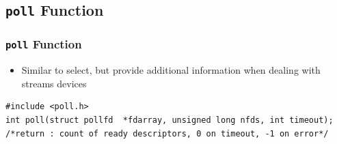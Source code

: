 \documentclass[notes,serif]{beamer}
\begin{document}
\subsection{\texttt{poll} Function}
\begin{frame}[containsverbatim]
\frametitle{\texttt{poll} Function}
\begin{itemize}
  \item Similar to select, but provide additional information when dealing with streams devices
\end{itemize}
{\scriptsize
\begin{verbatim}
#include <poll.h>
int poll(struct pollfd  *fdarray, unsigned long nfds, int timeout);
/*return : count of ready descriptors, 0 on timeout, -1 on error*/
\end{verbatim}
}
\end{frame}
\end{document}
